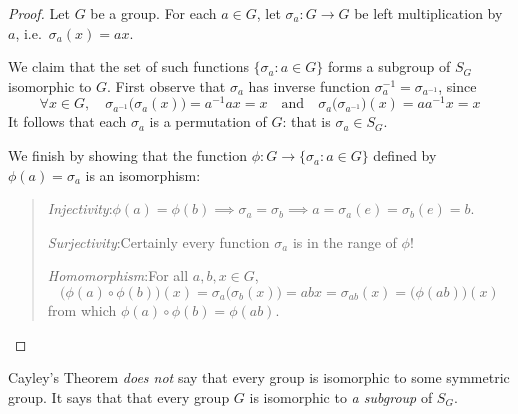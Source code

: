 \begin{proof}
Let $G$ be a group. For each $a\in G$, let $\sigma_a:G\to G$ be left multiplication by $a$, i.e.\ $\sigma_a(x)=ax$.\par
We claim that the set of such functions $\{\sigma_a:a\in G\}$ forms a subgroup of $S_G$ isomorphic to $G$.\smallbreak
First observe that $\sigma_a$ has inverse function $\sigma_a^{-1}=\sigma_{a^{-1}}$, since
\[
	\forall x\in G,\quad \sigma_{a^{-1}}\bigl(\sigma_{a}(x)\bigr)=a^{-1}ax=x \quad\text{and}\quad 	\sigma_a\bigl(\sigma_{a^{-1}}\bigr)(x)=aa^{-1}x=x
\]
It follows that each $\sigma_a$ is a permutation of $G$: that is $\sigma_a\in S_G$.\smallbreak

We finish by showing that the function $\phi:G\to\{\sigma_a:a\in G\}$ defined by $\phi(a)=\sigma_a$ is an isomorphism:
\begin{quote}
	\emph{Injectivity}:\quad $\phi(a)=\phi(b)\implies\sigma_a=\sigma_b\implies a=\sigma_a(e)=\sigma_b(e)=b$.\par
	\emph{Surjectivity}:\quad Certainly every function $\sigma_a$ is in the range of $\phi$!\par
	\emph{Homomorphism}:\quad For all $a,b,x\in G$,
	\[\bigl(\phi(a)\circ\phi(b)\bigr)(x)= \sigma_a\bigl(\sigma_b(x)\bigr)=abx=\sigma_{ab}(x) =\bigl(\phi(ab)\bigr)(x)\]
	from which $\phi(a)\circ\phi(b)=\phi(ab)$.\vspace{-20pt}
\end{quote}
\end{proof}

Cayley's Theorem \emph{does not} say that every group is isomorphic to some symmetric group. It says that that every group $G$ is isomorphic to \emph{a subgroup} of $S_G$.

\vfil
   

